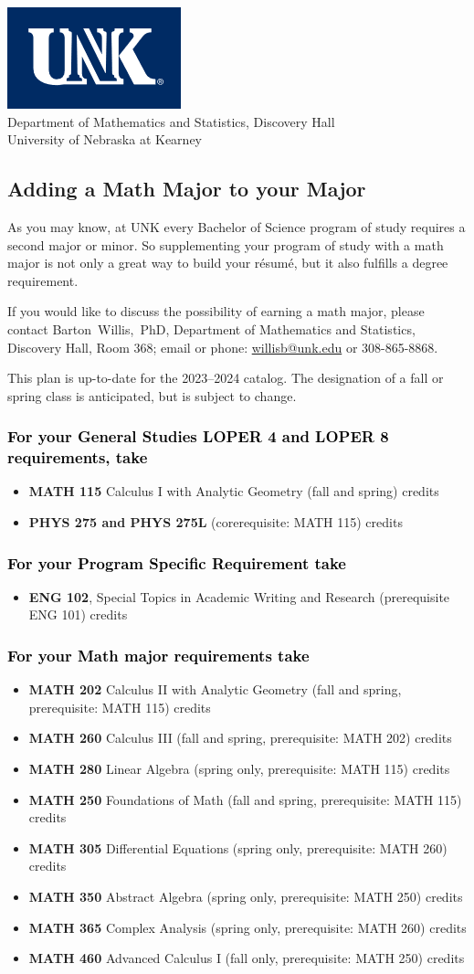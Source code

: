 \documentclass[11pt]{article}
\makeatletter
\newcommand{\calcone}{\textbf{MATH 115} Calculus I with Analytic Geometry (fall and spring) \dotfill 5 credits}
\newcommand{\calconeshort}{MATH 115}
\newcommand{\calctwo}{\textbf{MATH 202} Calculus II with Analytic Geometry (fall and spring, prerequisite: MATH 115) \dotfill 5 credits }
\newcommand{\foundations}{\textbf{MATH 250} Foundations of Math (fall and spring, prerequisite: MATH 115)  \dotfill 3 credits}
\newcommand{\calcthree}{\textbf{MATH 260} Calculus III  (fall and spring, prerequisite: MATH 202) \dotfill 5 credits}
\newcommand{\linear}{\textbf{MATH 280} Linear Algebra (spring only, prerequisite: MATH 115) \dotfill 3 credits}
\newcommand{\diffeq}{\textbf{MATH 305}	Differential Equations (spring only, prerequisite: MATH 260) \dotfill 	3 credits}
\newcommand{\abstractalgebra}{\textbf{MATH 350}	Abstract Algebra (spring only, prerequisite: MATH 250) \dotfill 	3 credits}
\newcommand{\complex}{\textbf{MATH 365}	Complex Analysis (spring only,  prerequisite: MATH 260) \dotfill 3 credits}
\newcommand{\advancedcalc}{\textbf{MATH 460}	Advanced Calculus I  (fall only,   prerequisite: MATH 250) \dotfill 3 credits}
\newcommand{\physics}{\textbf{PHYS 275 and PHYS 275L}  (corerequisite: \calconeshort) \dotfill 5 credits}
\newcommand{\contactbw}{\mbox{Barton Willis, PhD}, Department of Mathematics and Statistics,  Discovery Hall, Room 368;
email or phone: \href{mailto:willisb@unk.edu}{willisb@unk.edu} or 308-865-8868.}
\newcommand{\forinfo}[2]{If you would like to discuss the possibility of earning a math {#1}, please contact \contactbw}
\newcommand{\catalog}{2023--2024 }
\newcommand{\LOPER}{LOPER\xspace}
\newcommand{\uptodate}{This plan is up-to-date for  the \catalog catalog. The designation of a fall or spring class is 
anticipated, but  is subject to change.}
\newcommand{\myheading}{
\begin{flushleft}
\includegraphics[scale=0.35]{unk-logo}\\
\setcounter{footnote}{0}
\vspace{0.25in}
 \textcolor{unkblue}{Department of Mathematics and Statistics, Discovery Hall} \\
  \textcolor{unkblue}{University of Nebraska at Kearney}
\end{flushleft}}
\makeatother
\begin{document}
\newpage

\myheading


\subsection*{\textbf{\textcolor{unkblue}{Adding a Math Major to your Major}}}

As you may know, at UNK every Bachelor of Science program of study requires a second
major or minor. So supplementing your  program of study with a math major is not only a great
way to build your r\'esum\'e, but it also fulfills a degree requirement.


\forinfo{major}{program of study}

\uptodate

\subsubsection*{\textcolor{black}{For your General Studies \LOPER 4  and  \LOPER 8 requirements, take}}
\begin{itemize}
\item \calcone
   \item \physics 
\end{itemize}
\vspace{-0.1in}
\subsubsection*{\textcolor{black}{For your Program Specific Requirement take}}
\begin{itemize}
   \item \textbf{ENG 102}, Special Topics in Academic Writing and Research (prerequisite ENG 101)   credits
\end{itemize}
\vspace{-0.1in}
\subsubsection*{\textcolor{black}{For your Math major requirements take}}
\begin{itemize}
  \item \calctwo
  \item \calcthree
  \item \linear
\item \foundations
\item \diffeq
\item \abstractalgebra
\item \complex
\item \advancedcalc
\end{itemize}
\vspace{-0.1in}
\end{document}
